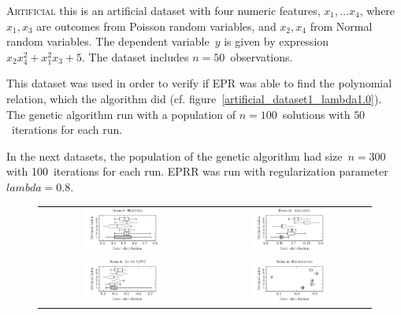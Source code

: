 \documentclass[preprint,authoryear,12pt]{elsarticle}
\begin{document}
\begin{description}
\item{\textsc{Artificial}} this is an artificial dataset with four numeric features, $x_1, \ldots x_4$, where $x_1,x_3$ are outcomes from Poisson random variables, and $x_2,x_4$ from Normal random variables. The dependent variable~$y$ is given by expression $x_2x_4^2 + x_1^2x_3 + 5$. The dataset includes $n=50$~observations.

This dataset was used in order to verify if \ac{EPR} was able to find the polynomial relation, which the algorithm did (cf. figure~\ref{artificial_dataset1_lambda1.0}). The genetic algorithm run with a population of $n=100$~solutions with $50$~iterations for each run.

In the next datasets, the population of the genetic algorithm had size~$n=300$ with 100~iterations for each run. \ac{EPRR} was run with regularization parameter $lambda = 0.8$.

\begin{figure}[tb]\begin{center}
\begin{tabular}{cc}
\includegraphics[width=0.48\textwidth]{figure_3a.pdf}
%
&
%
\includegraphics[width=0.48\textwidth]{figure_3b.pdf}
%
\\
%
\includegraphics[width=0.48\textwidth]{figure_3c.pdf}
%
&
%
\includegraphics[width=0.48\textwidth]{figure_3d.pdf}
%
\end{tabular}


\end{center}
\end{figure}
\end{description}
\end{document}
